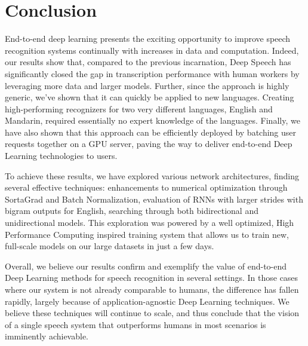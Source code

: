 \section{Conclusion}

End-to-end deep learning presents the exciting opportunity to improve speech
recognition systems continually with increases in data and computation.
Indeed, our results show that, compared to the previous incarnation, Deep
Speech has significantly closed the gap in transcription performance with human
workers by leveraging more data and larger models.  Further, since the approach
is highly generic, we've shown that it can quickly be applied to new languages.
Creating high-performing recognizers for two very different languages, English
and Mandarin, required essentially no expert knowledge of the languages.
Finally, we have also shown that this approach can be efficiently deployed by
batching user requests together on a GPU server, paving the way to deliver
end-to-end Deep Learning technologies to users. 

To achieve these results, we have explored various network architectures,
finding several effective techniques:  enhancements to numerical optimization
through SortaGrad and Batch Normalization, evaluation of RNNs with larger
strides with bigram outputs for English, searching through both bidirectional
and unidirectional models. This exploration was powered by a well optimized,
High Performance Computing inspired training system that allows us to train
new, full-scale models on our large datasets in just a few days.

Overall, we believe our results confirm and exemplify the value of end-to-end
Deep Learning methods for speech recognition in several settings.  In those
cases where our system is not already comparable to humans, the difference has
fallen rapidly, largely because of application-agnostic Deep Learning
techniques.  We believe these techniques will continue to scale, and thus
conclude that the vision of a single speech system that outperforms humans in
most scenarios is imminently achievable.
